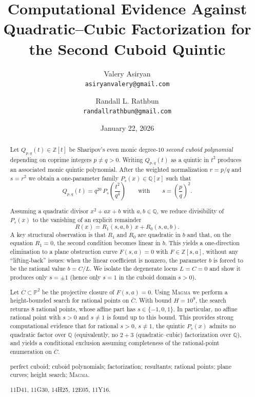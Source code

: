 \documentclass[12pt]{article}
\title{Computational Evidence Against Quadratic--Cubic Factorization for the Second Cuboid Quintic}
\author{Valery Asiryan\\[3pt]
\small \texttt{asiryanvalery@gmail.com}
\and
Randall L. Rathbun\\[3pt]
\small \texttt{randallrathbun@gmail.com}}
\date{\small January 22, 2026}
\theoremstyle{remark}
\theoremstyle{definition}
\begin{document}
\maketitle

\begin{abstract}
Let $Q_{p,q}(t)\in\mathbb{Z}[t]$ be Sharipov's even monic degree-$10$ \emph{second cuboid polynomial} depending on coprime integers $p\neq q>0$.
Writing $Q_{p,q}(t)$ as a quintic in $t^{2}$ produces an associated monic quintic polynomial.
After the weighted normalization $r=p/q$ and $s=r^{2}$ we obtain a one-parameter family $P_s(x)\in\mathbb{Q}[x]$ such that
\[
Q_{p,q}(t)=q^{20}\,P_s\!\left(\frac{t^{2}}{q^{4}}\right)\qquad\text{with}\qquad s=\left(\frac{p}{q}\right)^{2}.
\]

Assuming a quadratic divisor $x^{2}+ax+b$ with $a,b\in\mathbb{Q}$, we reduce divisibility of $P_s(x)$ to the vanishing of an explicit remainder
\[
R(x)=R_{1}(s,a,b)\,x+R_{0}(s,a,b).
\]
A key structural observation is that $R_1$ and $R_0$ are quadratic in $b$ and that, on the equation $R_1=0$, the second condition becomes linear in $b$.
This yields a one-direction elimination to a plane obstruction curve $F(s,a)=0$ with $F\in\mathbb{Z}[s,a]$, without any ``lifting-back'' issues: when the linear coefficient is nonzero, the parameter $b$ is forced to be the rational value $b=C/L$.
We isolate the degenerate locus $L=C=0$ and show it produces only $s=\pm 1$ (hence only $s=1$ in the cuboid domain $s>0$).

Let $\overline{C}\subset\mathbb{P}^{2}$ be the projective closure of $F(s,a)=0$.
Using \textsc{Magma} we perform a height-bounded search for rational points on $\overline{C}$.
With bound $H=10^{9}$, the search returns $8$ rational points, whose affine part has $s\in\{-1,0,1\}$.
In particular, no affine rational point with $s>0$ and $s\neq 1$ is found up to this bound.
This provides strong computational evidence that for rational $s>0$, $s\neq 1$, the quintic $P_s(x)$ admits no quadratic factor over $\mathbb{Q}$ (equivalently, no \emph{$2+3$} (quadratic--cubic) factorization over $\mathbb{Q}$), and yields a conditional exclusion assuming completeness of the rational-point enumeration on $\overline{C}$.

\medskip
{}
perfect cuboid; cuboid polynomials; factorization; resultants; rational points; plane curves; height search; \textsc{Magma}.

\smallskip
{} 11D41, 11G30, 14H25, 12E05, 11Y16.
\end{abstract}
\end{document}
